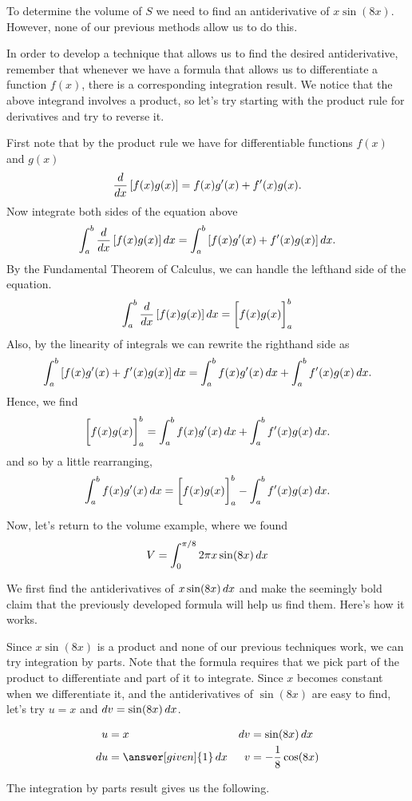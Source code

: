 \documentclass[noauthor]{ximera}
\begin{document}
\begin{model}
To determine the volume of $S$ we need to find an antiderivative of $x\sin(8x)$. However, none of our previous methods allow us to do this.

In order to develop a technique that allows us to find the desired antiderivative, remember that whenever we have a formula that allows us to differentiate a function $f(x)$, there is a corresponding integration result.  We notice that the above integrand involves a product, so let's try starting with the product rule for derivatives and try to reverse it.  

First note that by the product rule we have for differentiable functions $f(x)$ and $g(x)$
\[
\frac{d}{\mathop{}\!d x} \left[f(x)g(x)\right] = f(x)g'(x) + f'(x) g(x).
\]
Now integrate both sides of the equation above
\[
\int_a^b \frac{d}{\mathop{}\!d x} \left[ f(x) g(x) \right] \mathop{}\!d x = \int_a^b \left[f(x)g'(x) + f'(x) g(x)\right] \mathop{}\!d x.
\]
By the Fundamental Theorem of Calculus, we can handle the lefthand side of the equation.
\[
\int_a^b \frac{d}{\mathop{}\!d x} \left[f(x) g(x)\right] \mathop{}\!d x = \bigg[ f(x)g(x) \bigg]_a^b
\]
Also, by the linearity of integrals we can rewrite the righthand side as
\[
 \int_a^b \left[f(x)g'(x) + f'(x) g(x)\right] \mathop{}\!d x = \int_a^b f(x)g'(x)\mathop{}\!d x + \int_a^b f'(x) g(x) \mathop{}\!d x.
\]
Hence, we find
\[
\bigg[ f(x)g(x) \bigg]_a^b = \int_a^b f(x)g'(x)\mathop{}\!d x + \int_a^b f'(x) g(x) \mathop{}\!d x.
\]
and so by a little rearranging,
\[
 \int_a^b f(x)g'(x)\mathop{}\!d x = \bigg[ f(x)g(x) \bigg]_a^b -  \int_a^b f'(x) g(x) \mathop{}\!d x.
\]

Now, let's return to the volume example, where we found
\[
V=\int_{0}^{\pi/8} 2 \pi x\sin(8x) \mathop{}\!d x
\]

We first find the antiderivatives of $x\sin(8x) \mathop{}\!d x$ and make the seemingly bold claim that the previously developed formula will help us find them.  Here's how it works.

Since $x\sin(8x)$ is a product and none of our previous techniques work, we can try integration by parts.  Note that the formula requires that we pick part of the product to differentiate and part of it to integrate.  Since $x$ becomes constant when we differentiate it, and the antiderivatives of $\sin(8x)$ are easy to find, let's try $u=x$ and $\mathop{}\!d v=\sin(8x) \mathop{}\!d x$.  

\begin{align*}
u &= x & \d v & = \sin(8x) \d x \\
 \d u &= \answer[given]{1} \d x & v&=-\frac{1}{8}\cos(8x)
\end{align*}

The integration by parts result gives us the following.


\end{model}
\end{document}
